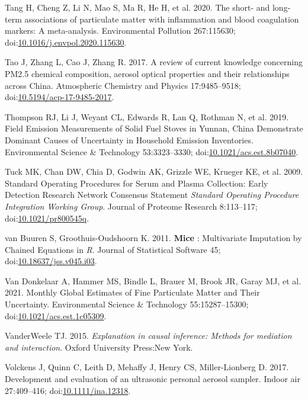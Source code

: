 \documentclass[
  letterpaper,
  DIV=11,
  numbers=noendperiod]{scrartcl}
\newlength{\cslhangindent}
\newenvironment{CSLReferences}[2] %
 {\begin{list}{}{%
  \setlength{\itemindent}{0pt}
  \setlength{\leftmargin}{0pt}
  \setlength{\parsep}{0pt}
  \ifodd #1
   \setlength{\leftmargin}{\cslhangindent}
   \setlength{\itemindent}{-1\cslhangindent}
  \fi
  \setlength{\itemsep}{#2\baselineskip}}}
 {\end{list}}
\begin{document}
\begin{CSLReferences}{1}{1}
Tang H, Cheng Z, Li N, Mao S, Ma R, He H, et al. 2020. The short- and
long-term associations of particulate matter with inflammation and blood
coagulation markers: {A} meta-analysis. Environmental Pollution
267:115630;
doi:\href{https://doi.org/10.1016/j.envpol.2020.115630}{10.1016/j.envpol.2020.115630}.

Tao J, Zhang L, Cao J, Zhang R. 2017. A review of current knowledge
concerning {PM2}.5 chemical composition, aerosol optical properties and
their relationships across {China}. Atmospheric Chemistry and Physics
17:9485--9518;
doi:\href{https://doi.org/10.5194/acp-17-9485-2017}{10.5194/acp-17-9485-2017}.

Thompson RJ, Li J, Weyant CL, Edwards R, Lan Q, Rothman N, et al. 2019.
Field {Emission Measurements} of {Solid Fuel Stoves} in {Yunnan}, {China
Demonstrate Dominant Causes} of {Uncertainty} in {Household Emission
Inventories}. Environmental Science \& Technology 53:3323--3330;
doi:\href{https://doi.org/10.1021/acs.est.8b07040}{10.1021/acs.est.8b07040}.

Tuck MK, Chan DW, Chia D, Godwin AK, Grizzle WE, Krueger KE, et al.
2009. Standard {Operating Procedures} for {Serum} and {Plasma
Collection}: {Early Detection Research Network Consensus Statement}
{\emph{Standard Operating Procedure Integration Working Group}}. Journal
of Proteome Research 8:113--117;
doi:\href{https://doi.org/10.1021/pr800545q}{10.1021/pr800545q}.

van Buuren S, Groothuis-Oudshoorn K. 2011. {\textbf{Mice}} :
{Multivariate Imputation} by {Chained Equations} in {\emph{R}}. Journal
of Statistical Software 45;
doi:\href{https://doi.org/10.18637/jss.v045.i03}{10.18637/jss.v045.i03}.

Van Donkelaar A, Hammer MS, Bindle L, Brauer M, Brook JR, Garay MJ, et
al. 2021. Monthly {Global Estimates} of {Fine Particulate Matter} and
{Their Uncertainty}. Environmental Science \& Technology
55:15287--15300;
doi:\href{https://doi.org/10.1021/acs.est.1c05309}{10.1021/acs.est.1c05309}.

VanderWeele TJ. 2015. \emph{Explanation in causal inference: Methods for
mediation and interaction}. Oxford University Press:New York.

Volckens J, Quinn C, Leith D, Mehaffy J, Henry CS, Miller-Lionberg D.
2017. Development and evaluation of an ultrasonic personal aerosol
sampler. Indoor air 27:409--416;
doi:\href{https://doi.org/10.1111/ina.12318}{10.1111/ina.12318}.


\end{CSLReferences}
\end{document}
